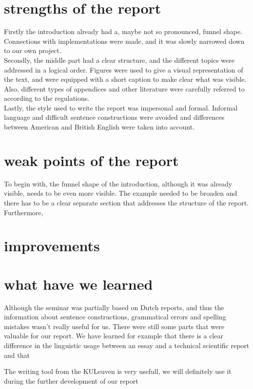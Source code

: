 \documentclass{article}
\begin{document}

\section{strengths of the report}

Firstly the introduction already had a, maybe not so pronounced, funnel shape. Connections with implementations were made, and it was slowly narrowed down to our own project.
\\
Secondly, the middle part had a clear structure, and the different topics were addressed in a logical order. Figures were used to give a visual representation of the text, and were equipped with a short caption to make clear what was visible. Also, different types of appendices and other literature were carefully referred to according to the regulations.
\\
Lastly, the style used to write the report was impersonal and formal. Informal language and difficult sentence constructions were avoided and differences between American and British English were taken into account. 

\section{weak points of the report}

To begin with, the funnel shape of the introduction, although it was already visible, needs to be even more visible. The example needed to be broaden and there has to be a clear separate section that addresses the structure of the report.
\\
Furthermore, 

\section{improvements}



\section{what have we learned}

Although the seminar was partially based on Dutch reports, and thus the information about sentence constructions, grammatical errors and spelling mistakes wasn't really useful for us. There were still some parts that were valuable for our report. We have learned for example 
that there is a clear difference in the linguistic usage between an essay and a technical scientific report and that 

The writing tool from the KULeuven is very usefull, we will definitely use it during the further development of our report
\end{document}
